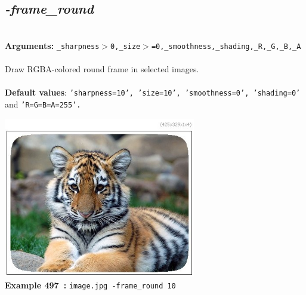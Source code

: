 \documentclass[a4paper,11pt,twoside]{book}
\begin{document}
\subsection{\emph{-frame\_round} }\vspace*{-0.5em}
~\\\textbf{Arguments: } 
{\small \texttt{\_sharpness$>$0,\_size$>$=0,\_smoothness,\_shading,\_R,\_G,\_B,\_A}}\\~\\
Draw RGBA-colored round frame in selected images.
~\\~\\\textbf{Default values}: {\small \texttt{'sharpness=10', 'size=10', 'smoothness=0', 'shading=0'} and \texttt{'R=G=B=A=255'.}}
\begin{center}\includegraphics[keepaspectratio=true,height=7cm,width=\textwidth]{img/gmic_def497.jpg}\\
{\footnotesize \textbf{Example 497~:} \texttt{image.jpg -frame\_round 10}}
\end{center}
\end{document}
